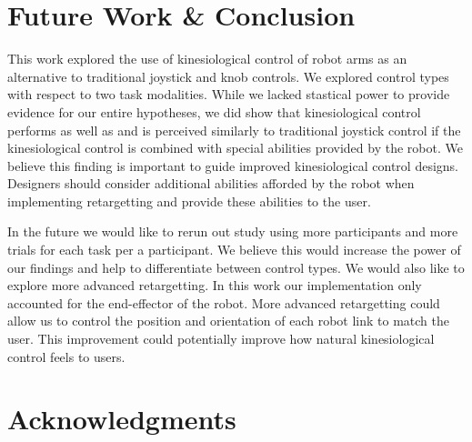 \documentclass{sigchi}
\newcommand\tabhead[1]{\small\textbf{#1}}
\begin{document}
\section{Future Work \& Conclusion}
This work explored the use of kinesiological control of robot arms as an alternative to traditional joystick and knob controls. We explored control types with respect to two task modalities. While we lacked stastical power to provide evidence for our entire hypotheses, we did show that kinesiological control performs as well as and is perceived similarly to traditional joystick control if the kinesiological control is combined with special abilities provided by the robot. We believe this finding is important to guide improved kinesiological control designs. Designers should consider additional abilities afforded by the robot when implementing retargetting and provide these abilities to the user.

In the future we would like to rerun out study using more participants and more trials for each task per a participant. We believe this would increase the power of our findings and help to differentiate between control types. We would also like to explore more advanced retargetting. In this work our implementation only accounted for the end-effector of the robot. More advanced retargetting could allow us to control the position and orientation of each robot link to match the user. This improvement could potentially improve how natural kinesiological control feels to users.


\section{Acknowledgments}
\end{document}
